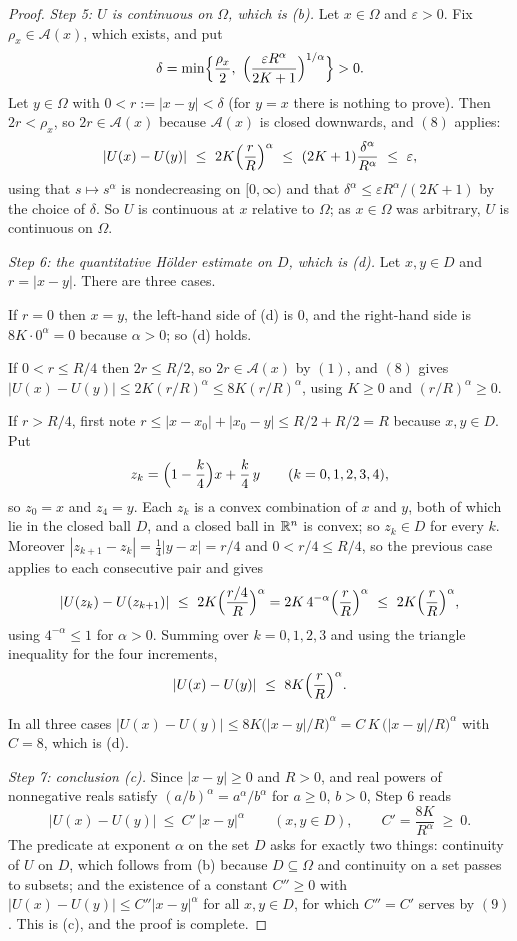 \begin{proof}
\emph{Step 5: $U$ is continuous on $\Omega$, which is (b).}  Let $x\in\Omega$
and $\varepsilon>0$.  Fix $\rho_x\in\mathcal A(x)$, which exists, and put
\[
\delta=\min\Bigl\{\frac{\rho_x}2,\ \Bigl(\frac{\varepsilon R^{\alpha}}{2K+1}\Bigr)^{1/\alpha}\Bigr\}>0 .
\]
Let $y\in\Omega$ with $0<r:=|x-y|<\delta$ (for $y=x$ there is nothing to prove).
Then $2r<\rho_x$, so $2r\in\mathcal A(x)$ because $\mathcal A(x)$ is closed
downwards, and $(8)$ applies:
\[
|U(x)-U(y)|\ \le\ 2K\Bigl(\frac rR\Bigr)^{\alpha}
\ \le\ (2K+1)\frac{\delta^{\alpha}}{R^{\alpha}}
\ \le\ \varepsilon ,
\]
using that $s\mapsto s^{\alpha}$ is nondecreasing on $[0,\infty)$ and that
$\delta^{\alpha}\le\varepsilon R^{\alpha}/(2K+1)$ by the choice of $\delta$.  So
$U$ is continuous at $x$ relative to $\Omega$; as $x\in\Omega$ was arbitrary,
$U$ is continuous on $\Omega$.

\emph{Step 6: the quantitative H\"older estimate on $D$, which is (d).}  Let
$x,y\in D$ and $r=|x-y|$.  There are three cases.

If $r=0$ then $x=y$, the left-hand side of (d) is $0$, and the right-hand side
is $8K\cdot0^{\alpha}=0$ because $\alpha>0$; so (d) holds.

If $0<r\le R/4$ then $2r\le R/2$, so $2r\in\mathcal A(x)$ by $(1)$, and $(8)$
gives $|U(x)-U(y)|\le2K(r/R)^{\alpha}\le8K(r/R)^{\alpha}$, using $K\ge0$ and
$(r/R)^{\alpha}\ge0$.

If $r>R/4$, first note $r\le|x-x_0|+|x_0-y|\le R/2+R/2=R$ because
$x,y\in D$.  Put
\[
z_k=\Bigl(1-\frac k4\Bigr)x+\frac k4\,y\qquad(k=0,1,2,3,4),
\]
so $z_0=x$ and $z_4=y$.  Each $z_k$ is a convex combination of $x$ and $y$, both
of which lie in the closed ball $D$, and a closed ball in $\mathbb{R}^n$ is convex; so
$z_k\in D$ for every $k$.  Moreover $|z_{k+1}-z_k|=\tfrac14|y-x|=r/4$ and
$0<r/4\le R/4$, so the previous case applies to each consecutive pair and gives
\[
|U(z_k)-U(z_{k+1})|\ \le\ 2K\Bigl(\frac{r/4}R\Bigr)^{\alpha}
=2K\,4^{-\alpha}\Bigl(\frac rR\Bigr)^{\alpha}
\ \le\ 2K\Bigl(\frac rR\Bigr)^{\alpha},
\]
using $4^{-\alpha}\le1$ for $\alpha>0$.  Summing over $k=0,1,2,3$ and using the
triangle inequality for the four increments,
\[
|U(x)-U(y)|\ \le\ 8K\Bigl(\frac rR\Bigr)^{\alpha}.
\]

In all three cases
$|U(x)-U(y)|\le8K\bigl(|x-y|/R\bigr)^{\alpha}=C\,K\,\bigl(|x-y|/R\bigr)^{\alpha}$
with $C=8$, which is (d).

\emph{Step 7: conclusion (c).}  Since $|x-y|\ge0$ and $R>0$, and real powers of
nonnegative reals satisfy $(a/b)^{\alpha}=a^{\alpha}/b^{\alpha}$ for $a\ge0$,
$b>0$, Step 6 reads
\[
|U(x)-U(y)|\ \le\ C'\,|x-y|^{\alpha}\qquad(x,y\in D),
\qquad C'=\frac{8K}{R^{\alpha}}\ \ge\ 0 .
\tag{9}
\]
The predicate  at exponent $\alpha$ on the set $D$ asks for
exactly two things: continuity of $U$ on $D$, which follows from (b) because
$D\subseteq\Omega$ and continuity on a set passes to subsets; and the existence
of a constant $C''\ge0$ with $|U(x)-U(y)|\le C''|x-y|^{\alpha}$ for all
$x,y\in D$, for which $C''=C'$ serves by $(9)$.  This is (c), and the proof is
complete.
\end{proof}
